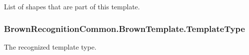 \-List of shapes that are part of this template. 

\hypertarget{class_brown_recognition_common_1_1_brown_template_a4e4ddd1ca40ec9c91266fae36e491d33}{
\subsubsection[{\-Template\-Type}]{ {\bf \-Brown\-Recognition\-Common.\-Brown\-Template.\-Template\-Type}}}
\label{class_brown_recognition_common_1_1_brown_template_a4e4ddd1ca40ec9c91266fae36e491d33}


\-The recognized template type. 

